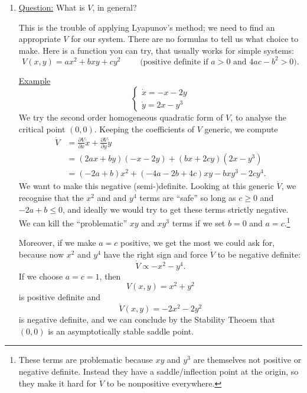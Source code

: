 \documentclass[11pt, letterpaper, oneside]{article}     %
\numberwithin{equation}{subsection}
\theoremstyle{definition}
\numberwithin{theorem}{section}
\theoremstyle{remark}
\begin{document}
\begin{enumerate}
  \medskip

\item \underline{Question:} What is $V$, in general?

  This is the trouble of applying Lyapunov's method; we need to find an appropriate $V$ for our system. There are no formulas to tell us what choice to make. Here is a function you can try, that usually works for simple systems: $$V(x,y) = ax^2 + bxy + cy^2\quad\quad \text{ (positive definite if $a>0$ and $4ac-b^2>0$)}.$$

  \underline{Example}
  \begin{equation}
    \begin{cases}
      \dot x = -x-2y\\
      \dot y = 2x-y^3
    \end{cases}
  \end{equation}
  We try the second order homogeneous quadratic form of $V$, to analyse the critical point $(0,0)$. Keeping the coefficients of $V$ generic, we compute
  \begin{equation}
    \begin{split}
      \dot V &= \frac{\partial V}{\partial x}\dot x + \frac{\partial V}{\partial y}\dot y\\
      &= (2ax + by)(-x-2y) + (bx + 2cy)(2x-y^3)\\
      &= (-2a + b)x^2 + (-4a - 2b + 4c)xy - bxy^3 - 2cy^4.
    \end{split}
  \end{equation}
  We want to make this negative (semi-)definite. Looking at this generic $\dot V$, we recognise that the $x^2$ and and $y^4$ terms are ``safe'' so long as $c \geq 0$ and $-2a + b \leq 0$, and ideally we would try to get these terms strictly negative. We can kill the ``problematic'' $xy$ and $xy^3$ terms if we set $b = 0$ and $a = c$.\footnote{These terms are problematic because $xy$ and $y^3$ are themselves not positive or negative definite. Instead they have a saddle/inflection point at the origin, so they make it hard for $\dot V$ to be nonpositive everywhere.}

  Moreover, if we make $a = c$ positive, we get the most we could ask for, because now $x^2$ and $y^4$ have the right sign and force $\dot V$ to be negative definite:
  \begin{equation}
    \dot V \propto -x^2 - y^4.
  \end{equation}
  If we choose $a = c = 1$, then
  \begin{equation}
    V(x,y) = x^2 + y^2
  \end{equation}
  is positive definite and
  \begin{equation}
    \dot V(x,y) = -2x^2 -2y^2
  \end{equation}
  is negative definite, and we can conclude by the Stability Theoem that $(0,0)$ is an asymptotically stable saddle point.


\end{enumerate}
\end{document}
